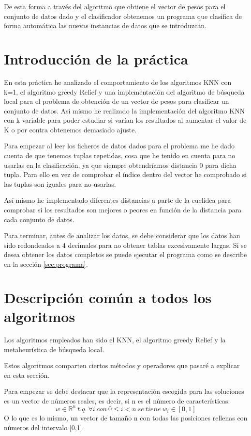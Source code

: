 \documentclass[12pt,a4paper]{article}
\begin{document}
	De esta forma a través del algoritmo que obtiene el vector de pesos para el conjunto de datos dado y el clasificador obtenemos un programa que clasifica de forma automática las nuevas instancias de datos que se introduzcan.

	\newpage

	\section{Introducción de la práctica}
	\label{sec:introPractica}

	En esta práctica he analizado el comportamiento de los algoritmos KNN con k=1, el algoritmo greedy Relief y una implementación del algoritmo de búsqueda local para el problema de obtención de un vector de pesos para clasificar un conjunto de datos. Así mismo he realizado la implementación del algoritmo KNN con k variable para poder estudiar si varían los resultados al aumentar el valor de K o por contra obtenemos demasiado ajuste.

	Para empezar al leer los ficheros de datos dados para el problema me he dado cuenta de que tenemos tuplas repetidas, cosa que he tenido en cuenta para no usarlas en la clasificación, ya que siempre obtendríamos distancia 0 para dicha tupla. Para ello en vez de comprobar el índice dentro del vector he comprobado si las tuplas son iguales para no usarlas.

	Así mismo he implementado diferentes distancias a parte de la euclídea para comprobar si los resultados son mejores o peores en función de la distancia para cada conjunto de datos.

	Para terminar, antes de analizar los datos, se debe considerar que los datos han sido redondeados a 4 decimales para no obtener tablas excesivamente largas. Si se desea obtener los datos completos se puede ejecutar el programa como se describe en la sección \hyperref[sec:programa]{\ref{sec:programa}}.


	\section{Descripción común a todos los algoritmos}
	Los algoritmos empleados han sido el KNN, el algoritmo greedy Relief y la metaheurística de búsqueda local.

	Estos algoritmos comparten ciertos métodos y operadores que pasaré a explicar en esta sección.

	Para empezar se debe destacar que la representación escogida para las soluciones es un vector de números reales, es decir, si n es el número de características:
	$$w\in \mathbb{R}^n \ t.q. \ \forall i \ con \ 0\leq i < n \ se \ tiene \ w_i \in [0,1]$$
	O lo que es lo mismo, un vector de tamaño n con todas las posiciones rellenas con números del intervalo [0,1].
\end{document}
